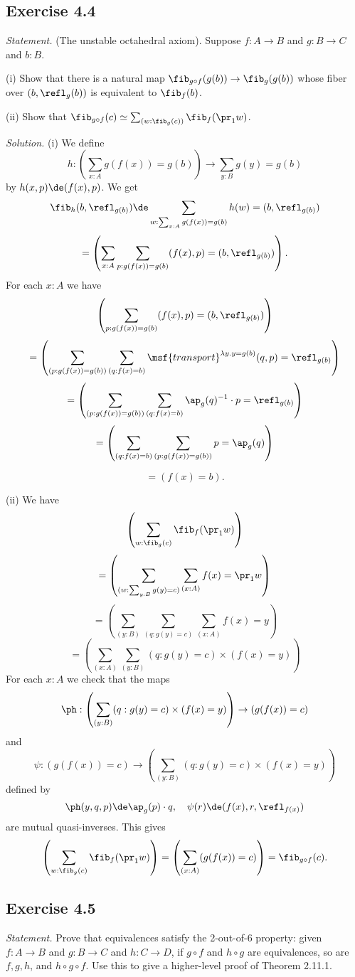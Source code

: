 \documentclass[12pt]{article}
\begin{document}

\subsection{Exercise 4.4}

\emph{Statement.} (The unstable octahedral axiom). Suppose $f:A\to B$ and $g:B\to C$ and $b:B$.

\nn(i) Show that there is a natural map $\fib_{g\circ f}(g(b))\to\fib_g(g(b))$ whose fiber over $(b, \refl_g(b) )$ is equivalent to $\fib_f(b)$.

\nn(ii) Show that $\fib_{g\circ f}(c)\simeq\sum_{(w:\fib_g(c))}\fib_f(\pr_1w)$.

\nn\emph{Solution.} (i) We define 
$$
h:\left(\sum_{x:A}g(f(x))=g(b)\right)\to\sum_{y:B}g(y)=g(b)
$$ 
by $h(x,p)\de(f(x),p)$. We get 
$$
\fib_h(b,\refl_{g(b)})\de\sum_{w:\sum_{x:A}g(f(x))=g(b)}h(w)=(b,\refl_{g(b)})
$$ 
$$
=\left(\sum_{x:A}\sum_{p:g(f(x))=g(b)}(f(x),p)=(b,\refl_{g(b)})\right).
$$ 
For each $x:A$ we have
$$
\left(\sum_{p:g(f(x))=g(b)}(f(x),p)=(b,\refl_{g(b)})\right)
$$ 
$$
=\left(\sum_{(p:g(f(x))=g(b))}\sum_{(q:f(x)=b)}\msf{transport}^{\lambda y.y=g(b)}(q,p)=\refl_{g(b)}\right)
$$ 
$$
=\left(\sum_{(p:g(f(x))=g(b))}\sum_{(q:f(x)=b)}\ap_g(q)^{-1}\cdot p=\refl_{g(b)}\right)
$$ 
$$
=\left(\sum_{(q:f(x)=b)}\sum_{(p:g(f(x))=g(b))}p=\ap_g(q)\right)
$$ 

$$
=(f(x)=b).
$$ 

\nn(ii) We have 
$$
\left(\sum_{w:\fib_g(c)}\fib_f(\pr_1w)\right)
$$ 
$$
=\left(\sum_{(w:\sum_{y:B}g(y)=c)}\sum_{(x:A)}f(x)=\pr_1w\right)
$$ 
$$
=\left(\sum_{(y:B)}\sum_{(q:g(y)=c)}\sum_{(x:A)}f(x)=y\right)
$$ 
$$
=\left(\sum_{(x:A)}\sum_{(y:B)}(q:g(y)=c)\times(f(x)=y)\right)
$$ 
For each $x:A$ we check that the maps 
$$
\ph:\left(\sum_{(y:B)}(q:g(y)=c)\times(f(x)=y)\right)\to(g(f(x))=c)
$$ 
and 
$$
\psi:(g(f(x))=c)\to\left(\sum_{(y:B)}(q:g(y)=c)\times(f(x)=y)\right)
$$ 
defined by 
$$
\ph(y,q,p)\de\ap_g(p)\cdot q,\quad\psi(r)\de(f(x),r,\refl_{f(x)})
$$ 
are mutual quasi-inverses. This gives 
$$
\left(\sum_{w:\fib_g(c)}\fib_f(\pr_1w)\right)=\left(\sum_{(x:A)}(g(f(x))=c)\right)=\fib_{g\circ f}(c).
$$


\subsection{Exercise 4.5}\label{45}

\emph{Statement.} Prove that equivalences satisfy the 2-out-of-6 property: given $f:A\to B$ and $g:B\to C$ and $h:C\to D$, if $g\circ f$ and $h\circ g$ are equivalences, so are $f,g,h$, and $h\circ g\circ f$. Use this to give a higher-level proof of Theorem 2.11.1.
\end{document}
